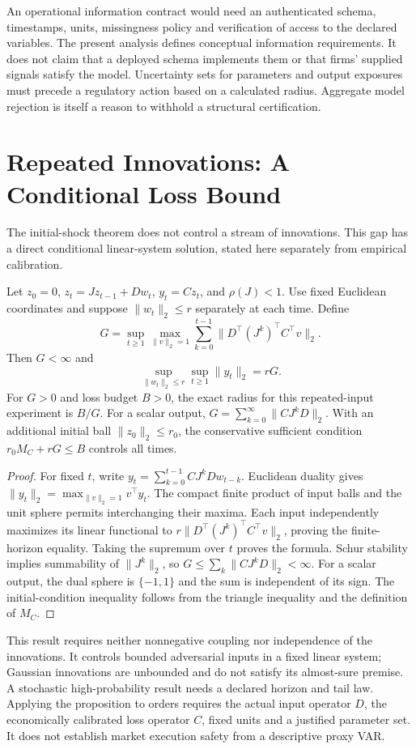 An operational information contract would need an authenticated schema, timestamps, units, missingness policy and verification of access to the declared variables. The present analysis defines conceptual information requirements. It does not claim that a deployed schema implements them or that firms' supplied signals satisfy the model. Uncertainty sets for parameters and output exposures must precede a regulatory action based on a calculated radius. Aggregate model rejection is itself a reason to withhold a structural certification.

\section{Repeated Innovations: A Conditional Loss Bound}
The initial-shock theorem does not control a stream of innovations. This gap has a direct conditional linear-system solution, stated here separately from empirical calibration.
\begin{proposition}
Let $z_0=0$, $z_t=Jz_{t-1}+Dw_t$, $y_t=Cz_t$, and $\rho(J)<1$. Use fixed Euclidean coordinates and suppose $\|w_t\|_2\le r$ separately at each time. Define
\[
G=\sup_{t\ge1}\max_{\|v\|_2=1}
\sum_{k=0}^{t-1}\|D^\top(J^k)^\top C^\top v\|_2.
\]
Then $G<\infty$ and
\[
\sup_{\|w_t\|_2\le r}\sup_{t\ge1}\|y_t\|_2=rG.
\]
For $G>0$ and loss budget $B>0$, the exact radius for this repeated-input experiment is $B/G$. For a scalar output, $G=\sum_{k=0}^\infty\|CJ^kD\|_2$. With an additional initial ball $\|z_0\|_2\le r_0$, the conservative sufficient condition $r_0 M_C+rG\le B$ controls all times.
\end{proposition}
\begin{proof}
For fixed $t$, write $y_t=\sum_{k=0}^{t-1}CJ^kDw_{t-k}$. Euclidean duality gives $\|y_t\|_2=\max_{\|v\|_2=1}v^\top y_t$. The compact finite product of input balls and the unit sphere permits interchanging their maxima. Each input independently maximizes its linear functional to $r\|D^\top(J^k)^\top C^\top v\|_2$, proving the finite-horizon equality. Taking the supremum over $t$ proves the formula. Schur stability implies summability of $\|J^k\|_2$, so $G\le\sum_k\|CJ^kD\|_2<\infty$. For a scalar output, the dual sphere is $\{-1,1\}$ and the sum is independent of its sign. The initial-condition inequality follows from the triangle inequality and the definition of $M_C$.
\end{proof}

This result requires neither nonnegative coupling nor independence of the innovations. It controls bounded adversarial inputs in a fixed linear system; Gaussian innovations are unbounded and do not satisfy its almost-sure premise. A stochastic high-probability result needs a declared horizon and tail law. Applying the proposition to orders requires the actual input operator $D$, the economically calibrated loss operator $C$, fixed units and a justified parameter set. It does not establish market execution safety from a descriptive proxy VAR.

